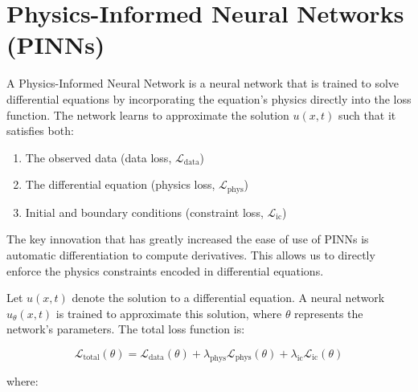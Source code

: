 \documentclass[12pt, a4paper]{report}
\begin{document}

\section{Physics-Informed Neural Networks (PINNs)}

A Physics-Informed Neural Network is a neural network that is trained to solve differential equations by incorporating the equation's physics directly into the loss function. The network learns to approximate the solution $u(x,t)$ such that it satisfies both:
\begin{enumerate}
    \item The observed data (data loss, $\mathcal{L}_{\text{data}}$)
    \item The differential equation (physics loss, $\mathcal{L}_{\text{phys}}$)
    \item Initial and boundary conditions (constraint loss, $\mathcal{L}_{\text{ic}}$)
\end{enumerate}

The key innovation that has greatly increased the ease of use of PINNs is automatic differentiation to compute derivatives. This allows us to directly enforce the physics constraints encoded in differential equations.

Let $u(x, t)$ denote the solution to a differential equation. A neural network $u_\theta(x, t)$ is trained to approximate this solution, where $\theta$ represents the network's parameters. The total loss function is:

\begin{equation}
\mathcal{L}_{\text{total}}(\theta) = \mathcal{L}_{\text{data}}(\theta) + \lambda_{\text{phys}} \mathcal{L}_{\text{phys}}(\theta) + \lambda_{\text{ic}} \mathcal{L}_{\text{ic}}(\theta)
\end{equation}

where:
\end{document}
